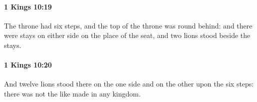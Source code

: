		\paragraph{1 Kings 10:19} %
			\label{1KINGS-10-19}

			The throne had six steps, and the top of the throne was round behind: and there were stays on either side on the place of the seat, and two lions stood beside the stays.


		\paragraph{1 Kings 10:20} %
			\label{1KINGS-10-20}

			And twelve lions stood there on the one side and on the other upon the six steps: there was not the like made in any kingdom.


